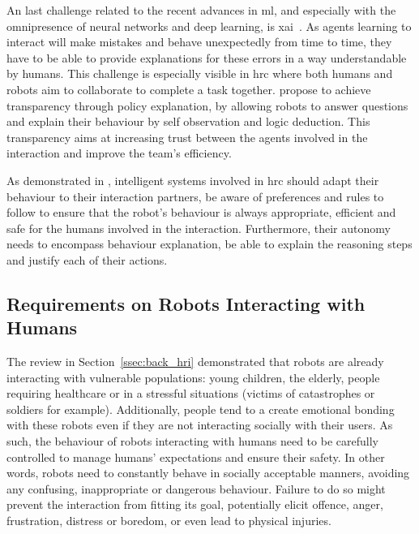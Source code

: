An last challenge related to the recent advances in \gls{ml}, and especially with the omnipresence of neural networks and deep learning, is \gls{xai}~\citep{wachter2017transparent}. As agents learning to interact will make mistakes and behave unexpectedly from time to time, they have to be able to provide explanations for these errors in a way understandable by humans. This challenge is especially visible in \gls{hrc} where both humans and robots aim to collaborate to complete a task together. \cite{hayes2017improving} propose to achieve transparency through policy explanation, by allowing robots to answer questions and explain their behaviour by self observation and logic deduction. This transparency aims at increasing trust between the agents involved in the interaction and improve the team's efficiency.

As demonstrated in \cite{munzer2017efficient}, intelligent systems involved in \gls{hrc} should adapt their behaviour to their interaction partners, be aware of preferences and rules to follow to ensure that the robot's behaviour is always appropriate, efficient and safe for the humans involved in the interaction. Furthermore, their autonomy needs to encompass behaviour explanation, be able to explain the reasoning steps and justify each of their actions.

\subsection{Requirements on Robots Interacting with Humans} \label{ssec:back_constraints}

The review in Section~\ref{ssec:back_hri} demonstrated that robots are already interacting with vulnerable populations: young children, the elderly, people requiring healthcare or in a stressful situations (victims of catastrophes or soldiers for example). Additionally, people tend to a create emotional bonding with these robots even if they are not interacting socially with their users. As such, the behaviour of robots interacting with humans need to be carefully controlled to manage humans' expectations and ensure their safety. In other words, robots need to constantly behave in socially acceptable manners, avoiding any confusing, inappropriate or dangerous behaviour. Failure to do so might prevent the interaction from fitting its goal, potentially elicit offence, anger, frustration, distress or boredom, or even lead to physical injuries. 

